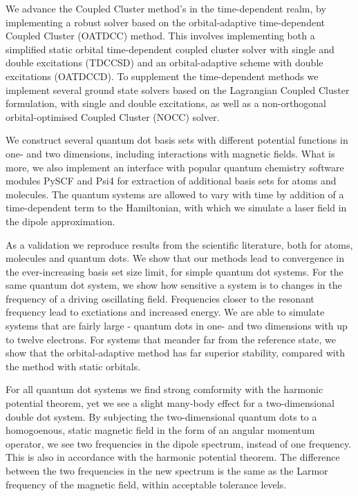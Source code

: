 We advance the Coupled Cluster method's in the time-dependent realm, 
by implementing a robust solver based on the orbital-adaptive time-dependent 
Coupled Cluster (OATDCC)\cite{kvaal2012ab} method.
This involves implementing both a simplified static
orbital time-dependent coupled cluster solver with single and double excitations 
(TDCCSD) and an orbital-adaptive scheme with double excitations (OATDCCD).
To supplement the time-dependent methods we implement several ground state 
solvers based on the Lagrangian Coupled Cluster formulation, with single and double 
excitations, as well as a non-orthogonal orbital-optimised Coupled Cluster (NOCC)
solver\cite{myhre2018demonstrating}.

We construct several quantum dot basis sets with different potential functions
in one- and two dimensions, including interactions with magnetic fields.
What is more, we also implement an 
interface with popular quantum chemistry software modules PySCF\cite{PYSCF}
and Psi4\cite{parrish2017psi4} for extraction of additional 
basis sets for atoms and molecules. The quantum systems are allowed to vary with time 
by addition of a time-dependent term to the Hamiltonian, with which we simulate 
a laser field in the dipole approximation.

As a validation we reproduce results from the scientific literature, both for 
atoms, molecules and quantum dots. We show that our methods lead to convergence in 
the ever-increasing basis set size limit, for simple quantum dot systems. For the 
same quantum dot system, we show how sensitive a system is to changes in the frequency
of 
a driving oscillating field. Frequencies closer to the resonant frequency 
lead to exctiations and increased energy. We are able to simulate systems that 
are fairly large - quantum dots in one- and two dimensions with up to twelve 
electrons. For systems that meander far from the reference state, we show that 
the orbital-adaptive method has far superior stability, compared with the 
method with static orbitals.

For all quantum dot systems we find 
strong comformity with the harmonic potential theorem\cite{kohn1961cyclotron},
yet we see a slight many-body 
effect for a two-dimensional double dot system. By subjecting the two-dimensional
quantum dots 
to a homogoenous, static magnetic field in the form of an angular 
momentum operator, we see two frequencies in the dipole spectrum, instead of one 
frequency. This
is also in accordance with the harmonic potential theorem.
The difference between the two frequencies in the new spectrum is the same as the
Larmor frequency of the magnetic field, within acceptable tolerance levels. 